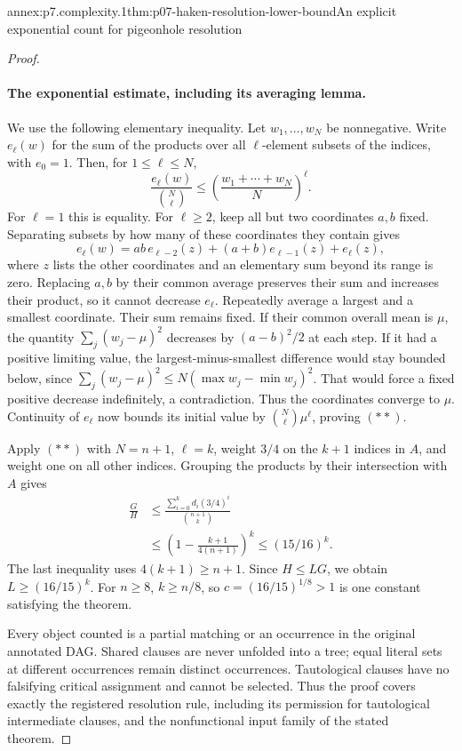 \begin{annexitem}{annex:p7.complexity.1}{thm:p07-haken-resolution-lower-bound}{An explicit exponential count for pigeonhole resolution}
\begin{proof}
\paragraph{The exponential estimate, including its averaging lemma.}
We use the following elementary inequality. Let \(w_1,\ldots,w_N\) be
nonnegative. Write \(e_\ell(w)\) for the sum of the products over
all \(\ell\)-element subsets of the indices, with \(e_0=1\).
Then, for \(1\leq\ell\leq N\),
\[
 \frac{e_\ell(w)}{\binom N\ell}
 \leq\left(\frac{w_1+\cdots+w_N}{N}\right)^\ell.             \tag{**}
\]
For \(\ell=1\) this is equality. For \(\ell\geq2\), keep all but
two coordinates \(a,b\) fixed. Separating subsets by how many of these
coordinates they contain gives
\[
 e_\ell(w)=ab\,e_{\ell-2}(z)+(a+b)e_{\ell-1}(z)+e_\ell(z),
\]
where \(z\) lists the other coordinates and an elementary sum beyond
its range is zero. Replacing \(a,b\) by their common average preserves
their sum and increases their product, so it cannot decrease
\(e_\ell\). Repeatedly average a largest and a smallest coordinate.
Their sum remains fixed. If their common overall mean is \(\mu\),
the quantity \(\sum_j(w_j-\mu)^2\) decreases by
\((a-b)^2/2\) at each step. If it had a positive limiting value,
the largest-minus-smallest difference would stay bounded below,
since \(\sum_j(w_j-\mu)^2\leq N(\max w_j-\min w_j)^2\).
That would force a fixed positive decrease indefinitely, a contradiction.
Thus the coordinates converge to \(\mu\). Continuity of \(e_\ell\)
now bounds its initial value by \(\binom N\ell\mu^\ell\), proving
\((**)\).

Apply \((**)\) with \(N=n+1\), \(\ell=k\), weight \(3/4\) on the
\(k+1\) indices in \(A\), and weight one on all other indices.
Grouping the products by their intersection with \(A\) gives
\[
 \begin{aligned}
 \frac GH
 &\leq\frac{\sum_{i=0}^{k}d_i(3/4)^i}{\binom{n+1}{k}}\\
 &\leq\left(1-\frac{k+1}{4(n+1)}\right)^k
 \leq(15/16)^k.
 \end{aligned}
\]
The last inequality uses \(4(k+1)\geq n+1\).
Since \(H\leq LG\), we obtain \(L\geq(16/15)^k\).
For \(n\geq8\), \(k\geq n/8\), so
\(c=(16/15)^{1/8}>1\) is one constant satisfying the theorem.

Every object counted is a partial matching or an occurrence in the
original annotated DAG. Shared clauses are never unfolded into a tree;
equal literal sets at different occurrences remain distinct occurrences.
Tautological clauses have no falsifying critical assignment and cannot
be selected. Thus the proof covers exactly the registered resolution
rule, including its permission for tautological intermediate clauses,
and the nonfunctional input family of the stated theorem.
\end{proof}
\end{annexitem}

